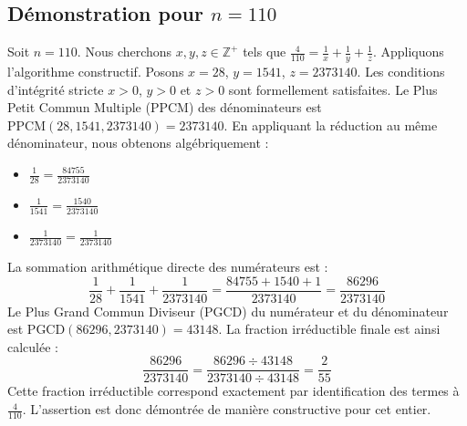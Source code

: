 \documentclass[11pt,a4paper]{article}
\begin{document}
\subsection{Démonstration pour $n = 110$}
Soit $n = 110$. Nous cherchons $x, y, z \in \mathbb{Z}^{+}$ tels que $\frac{4}{110} = \frac{1}{x} + \frac{1}{y} + \frac{1}{z}$.
Appliquons l'algorithme constructif. Posons $x = 28$, $y = 1541$, $z = 2373140$.
Les conditions d'intégrité stricte $x > 0$, $y > 0$ et $z > 0$ sont formellement satisfaites.
Le Plus Petit Commun Multiple (PPCM) des dénominateurs est $\text{PPCM}(28, 1541, 2373140) = 2373140$.
En appliquant la réduction au même dénominateur, nous obtenons algébriquement :
\begin{itemize}
    \item $\frac{1}{28} = \frac{84755}{2373140}$
    \item $\frac{1}{1541} = \frac{1540}{2373140}$
    \item $\frac{1}{2373140} = \frac{1}{2373140}$
\end{itemize}
La sommation arithmétique directe des numérateurs est :
$$ \frac{1}{28} + \frac{1}{1541} + \frac{1}{2373140} = \frac{84755 + 1540 + 1}{2373140} = \frac{86296}{2373140} $$
Le Plus Grand Commun Diviseur (PGCD) du numérateur et du dénominateur est $\text{PGCD}(86296, 2373140) = 43148$.
La fraction irréductible finale est ainsi calculée :
$$ \frac{86296}{2373140} = \frac{86296 \div 43148}{2373140 \div 43148} = \frac{2}{55} $$
Cette fraction irréductible correspond exactement par identification des termes à $\frac{4}{110}$. L'assertion est donc démontrée de manière constructive pour cet entier.
\end{document}
